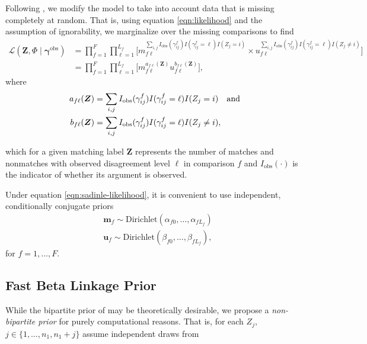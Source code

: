 \documentclass[ba]{imsart}
\newcommand{\bem}{\boldsymbol{m}}
\newcommand{\bu}{\boldsymbol{u}}
\newcommand{\bZ}{\boldsymbol{Z}}
\newcommand{\bgamma}{\boldsymbol{\gamma}}
\begin{document}
Following \cite{sadinle_bayesian_2017}, we modify the model to take into account data that is missing completely at random. That is, using equation \ref{eqn:likelihood} and the assumption of ignorability, we marginalize over the missing comparisons to find
\begin{align}
\label{eqn:sadinle-likelihood}
\mathcal{L}(\bZ, \Phi \mid \bgamma^{\text{obs}}) 
&= 
\prod_{f=1}^{F}
\prod_{\ell=1}^{L_f}
\bigg[
m_{f\ell}^{
\sum_{i,j} I_{\text{obs}}(\gamma_{ij}^f)I(\gamma_{ij}^f = \ell)I(Z_j = i)
}
\times
u_{f\ell}^{
\sum_{i,j} I_{\text{obs}}(\gamma_{ij}^f)I(\gamma_{ij}^f = \ell)I(Z_j \neq i)
}
\bigg]\\
& = 
\prod_{f=1}^{F}
\prod_{\ell=1}^{L_f}
\bigg[
m_{f\ell}^{a_{f\ell}(\bZ)}
u_{f\ell}^{b_{f\ell}(\bZ)}
\bigg],
\end{align}
where 
\begin{align}
\label{eqn:ab}
a_{f\ell}(\bZ) &= \sum_{i,j} I_{\text{obs}}(\gamma_{ij}^f)I(\gamma_{ij}^f = \ell)I(Z_j = i) \quad \text{and} \\
b_{f\ell}(\bZ) &= \sum_{i,j} I_{\text{obs}}(\gamma_{ij}^f)I(\gamma_{ij}^f = \ell)I(Z_j \neq i), \notag
\end{align}

which for a given matching label $\bZ$ represents the number of matches and nonmatches with observed disagreement level $\ell$ in comparison $f$ and $I_{\text{obs}}(\cdot)$ is the indicator of whether its argument is observed.


Under equation \ref{eqn:sadinle-likelihood}, it is convenient to use independent, conditionally conjugate priors
\begin{align}
\label{eqn:fabl-priors}
&\bem_f \sim \text{Dirichlet}(\alpha_{f0}, \ldots, \alpha_{fL_f}) \\
&\bu_f \sim \text{Dirichlet}(\beta_{f0}, \ldots, \beta_{fL_f}),
\end{align}
for $f=1, \ldots, F.$

\subsection{Fast Beta Linkage Prior}
\label{sec:fabl-prior}

While the bipartite prior of \cite{sadinle_bayesian_2017} may be theoretically desirable, we propose a \textit{non-bipartite prior} for purely computational reasons. That is, for each $Z_j,$ $j \in \{1, \ldots, n_1, n_1 + j \}$ assume independent draws from
\end{document}
